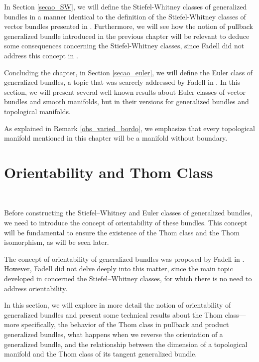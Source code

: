 \documentclass[12pt,oneside]{book}
\begin{document}
    In Section \ref{secao_SW}, we will define the Stiefel-Whitney classes of generalized bundles in a manner identical to the definition of 
    the Stiefel-Whitney classes of vector bundles presented in \cite{milnor_1}. Furthermore, we will see how the notion 
    of pullback generalized bundle introduced in the previous chapter will be relevant to deduce some consequences concerning the 
    Stiefel-Whitney classes, since Fadell did not address this concept in \cite{fadell_1}.
    
    Concluding the chapter, in Section \ref{secao_euler}, we will define the Euler class of generalized bundles, a topic that was scarcely 
    addressed by Fadell in \cite{fadell_1}. In this section, we will present several well-known results about Euler classes of vector 
    bundles and smooth manifolds, but in their versions for generalized bundles and topological manifolds.
    
    As explained in Remark \ref{obs_varied_bordo}, we emphasize that every topological manifold mentioned in this chapter will be a 
    manifold without boundary.
    


    \section{Orientability and Thom Class}\label{secao_thom}

    \

    Before constructing the Stiefel–Whitney and Euler classes of generalized 
    bundles, we need to introduce the concept of orientability of these bundles. This concept will be fundamental 
    to ensure the existence of the Thom class and the Thom isomorphism, as will be seen later.

    The concept of orientability of generalized bundles was proposed by Fadell in \cite{fadell_1}. However, Fadell did not delve deeply into 
    this matter, since the main topic developed in \cite{fadell_1} concerned the Stiefel–Whitney classes, for which there is no need to 
    address orientability.

    In this section, we will explore in more detail the notion of orientability of generalized bundles and present some technical results 
    about the Thom class—more specifically, the behavior of the Thom class in pullback and 
    product generalized bundles, what happens when we reverse the orientation of a generalized bundle, and 
    the relationship between the dimension of a topological manifold and the Thom class of its tangent generalized 
    bundle.
\end{document}
